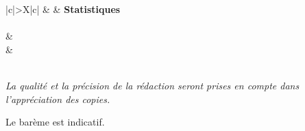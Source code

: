 \documentclass[10pt,french]{book}
\newcounter{exoc}
\begin{document}
\clearpage\setcounter{exoc}{0}



\begin{center}
\begin{tabularx}{\textwidth}{|c|>\centering X|c|}
	\iere {} &   & \textbf{Statistiques} \\
	\hline
		 \\
	\hline
         &  \\
		 &  \\
	\hline
         \\[1cm]
    \hline
\end{tabularx}\bigskip

{\itshape
La qualité et la précision de la rédaction seront prises en compte dans l'appréciation des copies.\par
Le barème est indicatif.}
\end{center}
\end{document}
